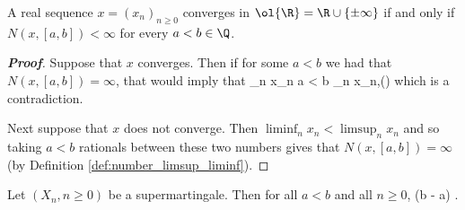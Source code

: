 


\begin{lemma}\label{lem:up_crossing_finite}
A real sequence $x = (x_n)_{n \geq 0}$ converges in $\ol{\R} = \R\cup \{\pm \infty\}$ if and only if $N(x, [a, b]) <\infty$ for every $a < b \in \Q$.
\end{lemma}

\begin{proof}[\bf Proof]
Suppose that $x$ converges. Then if for some $a<b$ we had that $N(x,[a,b]) = \infty$, that would imply that
\be
\liminf_n x_n \leq a < b \leq \limsup_n x_n,\qquad ()
\ee
which is a contradiction.

Next suppose that $x$ does not converge. Then $\liminf_n x_n < \limsup_n x_n$ and so taking $a<b$ rationals between these two numbers gives that $N(x,[a,b]) = \infty$ (by Definition \ref{def:number_limsup_liminf}).
\end{proof}

\begin{lemma}\label{lem:up_crossing_inequality}
Let $(X_n, n \geq 0)$ be a supermartingale. Then for all $a < b$ and all $n \geq 0$,
\be
(b - a)\E{} \leq \E{}.
\ee
\end{lemma}

